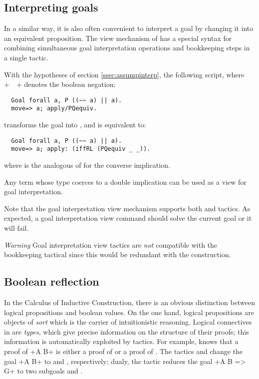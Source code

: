 \subsection{Interpreting goals}\label{ssec:goalinterp}

In a similar way, it is also often convenient to interpret a goal by changing
it into an equivalent proposition. The view mechanism of \ssr{} has a
special syntax  for combining simultaneous goal
interpretation operations and
bookkeeping steps in a single tactic.

With the hypotheses of section \ref{ssec:assumpinterp}, the following
script, where \ssrL+~~+ denotes the boolean negation:
\begin{lstlisting}
  Goal forall a, P ((~~ a) || a).
  move=> a; apply/PQequiv.
\end{lstlisting}
transforms the goal into , and is equivalent to:
\begin{lstlisting}
  Goal forall a, P ((~~ a) || a).
  move=> a; apply: (iffRL (PQequiv _ _)).
\end{lstlisting}
where  is the analogous of  for the converse
implication.

Any \ssr{} term whose type coerces to a double implication can be used
as a view for goal interpretation.

Note that the goal interpretation view mechanism supports both
 and  tactics. As expected, a goal interpretation
view command  should solve the current goal or it will
fail.


\emph{Warning} Goal interpretation view tactics are \emph{not} compatible
with the bookkeeping tactical \ssrC{=>} since this would be redundant with
the  {\term} \ssrC{=> _} construction.

\subsection{Boolean reflection}\label{ssec:boolrefl}
In the Calculus of Inductive Construction, there is
an obvious distinction between logical propositions and boolean values.
On the one hand, logical propositions are objects
of \emph{sort}  which is the carrier of intuitionistic
reasoning. Logical connectives in  are \emph{types}, which give precise
information on the structure of their proofs; this information is
automatically exploited by \Coq{} tactics. For example, \Coq{} knows that a
proof of \ssrL+A \/ B+ is either a proof of  or a proof of .
The tactics  and  change the goal \ssrL+A \/ B+
to  and , respectively; dualy, the tactic  reduces the goal
\ssrL+A \/ B => G+ to two subgoals  and .

